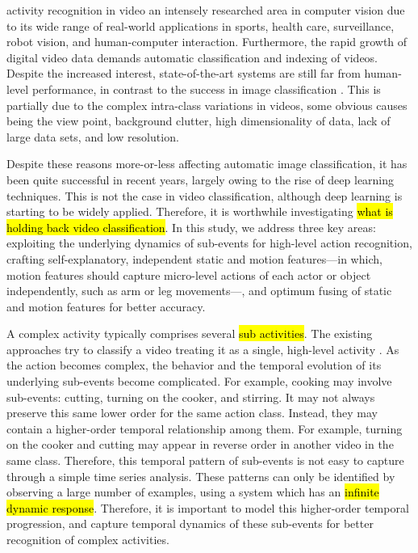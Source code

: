 
 activity recognition in video
an intensely researched area in computer vision due to its wide range of real-world applications in
sports, health care, surveillance, robot vision, and human-computer interaction.
Furthermore, the rapid growth of digital video data demands automatic
classification and indexing of videos. Despite the increased interest, state-of-the-art
systems are still far from human-level performance, in contrast to the success in image classification \cite{girshick2014rich, krizhevsky2012imagenet}. This is partially due to the complex intra-class variations in videos, some obvious causes being the view point, background
clutter, high dimensionality of data, lack of large data sets, and low resolution.

Despite these reasons more-or-less affecting automatic image classification, it has been quite successful in recent years,
largely owing to the rise of deep learning techniques. This is not the case in video classification, although deep learning is
starting to be widely applied. Therefore, it is worthwhile investigating
\hl{what is holding back video classification}. In this study, we address three key
areas: exploiting the underlying dynamics of sub-events for high-level action recognition, crafting
self-explanatory, independent static and motion features---in which, motion features should capture micro-level actions
of each actor or object independently, such as arm or leg movements---, and optimum fusing of static and motion features for better accuracy.

A complex activity typically comprises several \hl{sub activities}.
The existing approaches try to classify a video treating it as a
single, high-level activity \cite{wang2011action, wang2013action, simonyan2014two, 7486474}.
As the action becomes complex, the behavior and the
temporal evolution of its underlying sub-events become complicated. For example,
cooking may involve sub-events: cutting, turning on the cooker, and stirring. It may not always preserve this
same lower order for the same action class. Instead, they may contain
a higher-order temporal relationship among them. For example, turning on the cooker and cutting
may appear in reverse order in another video in the same class.
Therefore, this temporal pattern of sub-events is not easy to capture through a simple
time series analysis. These patterns can only be identified by observing a large number
of examples, using a system which has an \hl{infinite dynamic response}. Therefore, it is important to
model this higher-order temporal
progression, and capture temporal dynamics of these sub-events for better recognition of
complex activities.

